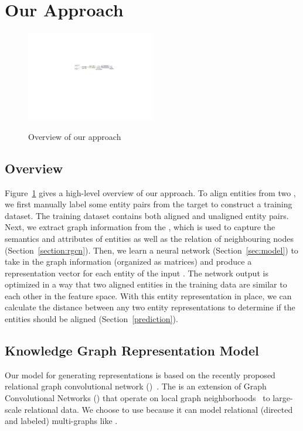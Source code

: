 \section{Our Approach}
	\label{section:app}
\begin{figure}
  \centering
  \includegraphics[width=0.5\textwidth]{figures/overview.pdf}\\
  \caption{Overview of our approach}\label{fig:overview}
\end{figure}

\subsection{Overview}
Figure~\ref{fig:overview} gives a high-level overview of our approach. To align entities from two \KGs, we first manually label some entity
pairs from the target \KGs to construct a training dataset. The training dataset contains both aligned and unaligned entity pairs. Next, we
extract graph information from the \KGs, which is used to capture the semantics and attributes of entities as well as the relation of
neighbouring nodes (Section~\ref{section:rgcn}). Then, we learn a neural network (Section~\ref{sec:model}) to take in the graph information
(organized as matrices) and produce a representation vector for each entity of the input \KGs. The network output is optimized in a way
that two aligned entities in the training data are similar to each other in the feature space. With this entity representation in place, we
can calculate the distance between any two entity representations to determine if the entities should be aligned
(Section~\ref{prediction}).

	

	
    \subsection{Knowledge Graph Representation Model\label{sec:model}}
    Our model for generating \KG representations  is based on the recently proposed relational graph convolutional network (\RGCN)~\cite{Schlichtkrull2017Modeling}.
    The \RGCN is an extension of Graph Convolutional Networks (\GCNs) that operate on local graph neighborhoods~\cite{Duvenaud2015Convolutional,Kipf2016Semi} to large-scale relational data.
    We choose to use \RGCN because it can model relational (directed and labeled) multi-graphs like \KGs.

